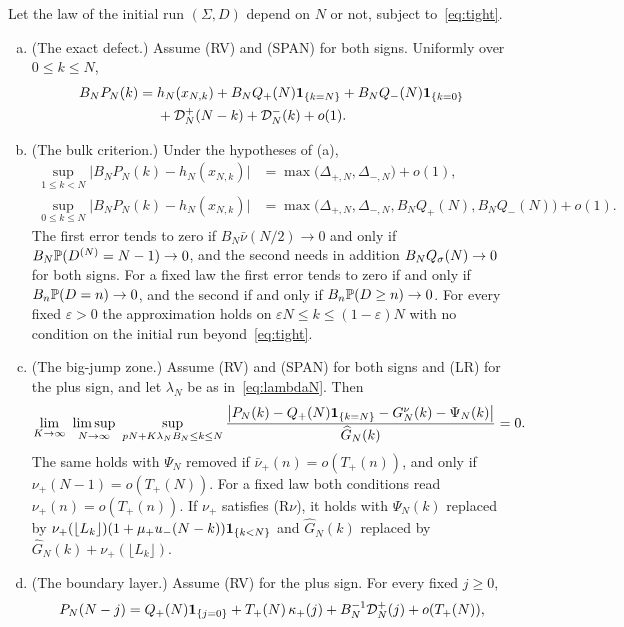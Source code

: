 \begin{introtheorem}\label{thm:preparation}
Let the law of the initial run $(\Sigma,D)$ depend on $N$ or not, subject to~\eqref{eq:tight}.
\begin{enumerate}[(a)]
\item (The exact defect.) Assume (RV) and (SPAN) for both signs. Uniformly over
$0\le k\le N$,
\begin{align*}
 B_NP_N(k)={}&h_N(x_{N,k})
 +B_NQ_{+}(N)\mathbf{1}_{\{k=N\}}+B_NQ_{-}(N)\mathbf{1}_{\{k=0\}}\\
 &+\mathcal D^{+}_N(N-k)+\mathcal D^{-}_N(k)+o(1).
\end{align*}
\item (The bulk criterion.) Under the hypotheses of (a),
\begin{align*}
 \sup_{1\le k<N}\bigl|B_NP_N(k)-h_N(x_{N,k})\bigr|&=\max\bigl(\Delta_{\plus,N},\Delta_{\minus,N}\bigr)+o(1),\\
 \sup_{0\le k\le N}\bigl|B_NP_N(k)-h_N(x_{N,k})\bigr|&=\max\bigl(\Delta_{\plus,N},\Delta_{\minus,N},B_NQ_\plus(N),B_NQ_\minus(N)\bigr)+o(1).
\end{align*}
The first error tends to zero if $B_N\bar\nu(N/2)\to0$ and only if $B_N\mathbb{P}(D^{(N)}=N-1)\to0$,
and the second needs in addition $B_NQ_\sigma(N)\to0$ for both signs. For a fixed law the
first error tends to zero if and only if $B_n\mathbb{P}(D=n)\to0$, and the second if and only if
$B_n\mathbb{P}(D\ge n)\to0$. For every fixed $\varepsilon>0$ the approximation holds on
$\varepsilon N\le k\le(1-\varepsilon)N$ with no condition on the initial run
beyond~\eqref{eq:tight}.
\item (The big-jump zone.) Assume (RV) and (SPAN) for both signs and (LR) for the
plus sign, and let $\lambda_N$ be as in~\eqref{eq:lambdaN}. Then
\[
 \lim_{K\to\infty}\ \limsup_{N\to\infty}\ \sup_{pN+K\lambda_NB_N\le k\le N}
 \frac{\bigl|P_N(k)-Q_\plus(N)\ones_{\{k=N\}}-G^\nu_N(k)-\Psi_N(k)\bigr|}{\widehat G_N(k)}=0 .
\]
The same holds with $\Psi_N$ removed if $\bar\nu_\plus(n)=o(T_\plus(n))$, and only if
$\nu_\plus(N-1)=o(T_\plus(N))$. For a fixed law both conditions read
$\nu_\plus(n)=o(T_\plus(n))$. If $\nu_\plus$ satisfies (R$\nu$), it holds with $\Psi_N(k)$
replaced by $\nu_{+}(\lfloor L_k\rfloor)(1+\mu_{+} u_{-}(N-k))\mathbf{1}_{\{k<N\}}$ and
$\widehat G_N(k)$ replaced by $\widehat G_N(k)+\nu_\plus(\lfloor L_k\rfloor)$.
\item (The boundary layer.) Assume (RV) for the plus sign. For every fixed $j\ge0$,
\[
 P_N(N-j)=Q_{+}(N)\mathbf{1}_{\{j=0\}}+T_{+}(N)\,\kappa_{+}(j)+B_N^{-1}\mathcal D^{+}_N(j)+o(T_{+}(N)),
\]
\end{enumerate}
\end{introtheorem}
